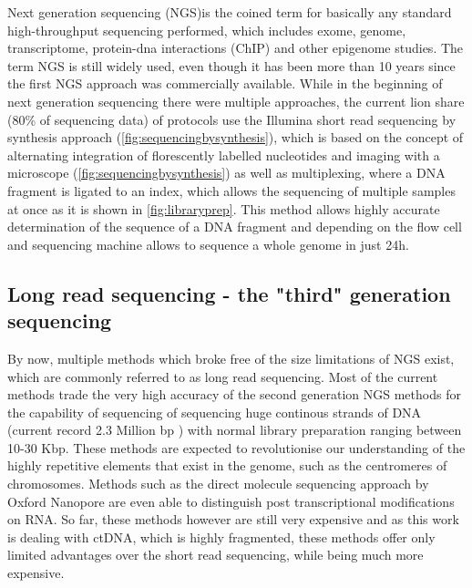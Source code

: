 Next generation sequencing (NGS)is the coined term for basically any standard high-throughput sequencing performed, which includes exome, genome, transcriptome, protein-dna interactions (ChIP) and other epigenome studies. The term NGS is still widely used, even though it has been more than 10 years since the first NGS approach was commercially available. While in the beginning of next generation sequencing there were multiple approaches, the current lion share (80\% of sequencing data) of protocols use the Illumina short read sequencing by synthesis approach (\autoref{fig:sequencingbysynthesis})\cite{Mardis2008,Straiton2019}, which is based on the concept of alternating integration of florescently labelled nucleotides and imaging with a microscope (\autoref{fig:sequencingbysynthesis}) as well as multiplexing, where a DNA fragment is ligated to an index, which allows the sequencing of multiple samples at once \cite{Church1984,Church1988} as it is shown in \autoref{fig:libraryprep}. This method allows highly accurate determination of the sequence of a DNA fragment and depending on the flow cell and sequencing machine allows to sequence a whole genome in just 24h.

\subsection[Long read sequencing]{Long read sequencing - the "third" generation sequencing}
\label{intro-sec:lrs}
By now, multiple methods which broke free of the size limitations of NGS exist, which are commonly referred to as long read sequencing. Most of the current methods trade the very high accuracy of the second generation NGS methods for the capability of sequencing of sequencing huge continous strands of DNA (current record 2.3 Million bp \cite{Payne2018}) with normal library preparation ranging between 10-30 Kbp. 
These methods are expected to revolutionise our understanding of the highly repetitive elements that exist in the genome, such as the centromeres of chromosomes. Methods such as the direct molecule sequencing approach by Oxford Nanopore are even able to distinguish post transcriptional modifications on RNA\cite{Pratanwanich2021}.
So far, these methods however are still very expensive and as this work is dealing with ctDNA, which is highly fragmented, these methods offer only limited advantages over the short read sequencing, while being much more expensive.

